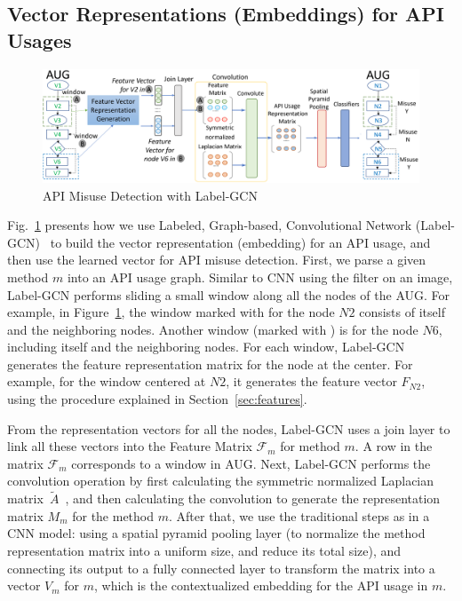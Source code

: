 \subsection{Vector Representations (Embeddings) for API Usages}

\begin{figure}[t]
\begin{center}
\includegraphics[width=5.8in]{gcn-detection.png}
\vspace{-5pt}
\caption{API Misuse Detection with Label-GCN}
\label{fig:gcn-detection}
\end{center}
\end{figure}

Fig.~\ref{fig:gcn-detection} presents how we use Labeled, Graph-based,
Convolutional Network (Label-GCN)~\cite{label-gcn} to build the vector
representation (embedding) for an API usage, and then use the learned
vector for API misuse detection. First, we parse a given method $m$
into an API usage graph. Similar to CNN using the filter on an image,
Label-GCN performs sliding a small window along all the nodes of the
AUG. For example, in Figure~\ref{fig:gcn-detection}, the window marked
with  for the node $N2$ consists of itself and the
neighboring nodes. Another window (marked with ) is for the
node $N6$, including itself and the neighboring nodes. For each
window, Label-GCN generates the feature representation matrix for the
node at the center. For example, for the window centered at $N2$, it
generates the feature vector $F_{N2}$, using the procedure explained in
Section~\ref{sec:features}.

From the representation vectors for all the nodes, Label-GCN uses a
join layer to link all these vectors into the Feature Matrix
$\mathcal{F}_{m}$ for method $m$. A row in the matrix $\mathcal{F}_m$
corresponds to a window in AUG. Next, Label-GCN performs the
convolution operation by first calculating the symmetric normalized
Laplacian matrix~$\tilde{A}$~\cite{GCN16}, and then calculating the
convolution to generate the representation matrix $M_{m}$ for the
method $m$. After that, we use the traditional steps as in a CNN
model: using a spatial pyramid pooling layer (to normalize the method
representation matrix into a uniform size, and reduce its total size),
and connecting its output to a fully connected layer to transform the
matrix into a vector $V_m$ for $m$, which is the
contextualized embedding for the API usage in $m$.





